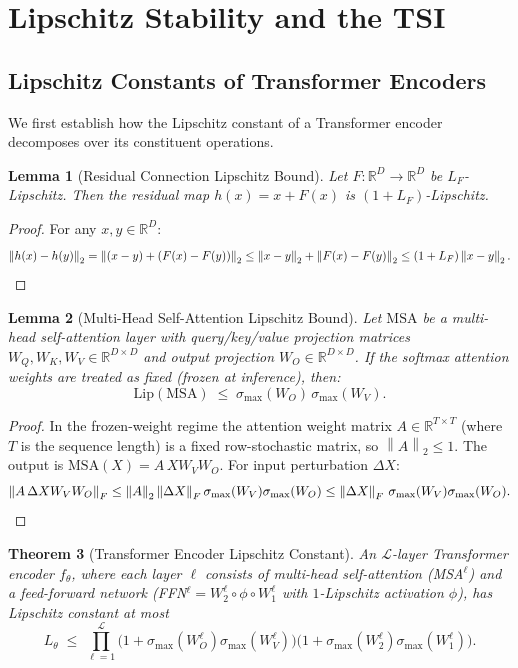 \documentclass[12pt]{article}
\newtheorem{theorem}{Theorem}[section]
\newtheorem{lemma}[theorem]{Lemma}
\theoremstyle{definition}
\theoremstyle{remark}
\newcommand{\R}{\mathbb{R}}
\newcommand{\norm}[1]{\left\lVert #1 \right\rVert}
\newcommand{\Lip}{\mathrm{Lip}}
\newcommand{\smax}{\sigma_{\max}}
\begin{document}
\section{Lipschitz Stability and the TSI}
\label{sec:stability_theory}

\subsection{Lipschitz Constants of Transformer Encoders}

We first establish how the Lipschitz constant of a Transformer encoder
decomposes over its constituent operations.

\begin{lemma}[Residual Connection Lipschitz Bound]
\label{lem:residual}
Let $F : \R^D \to \R^D$ be $L_F$-Lipschitz. Then the residual map
$h(x) = x + F(x)$ is $(1 + L_F)$-Lipschitz.
\end{lemma}

\begin{proof}
For any $x, y \in \R^D$:
\[
  \norm{h(x) - h(y)}_2 = \norm{(x-y) + (F(x)-F(y))}_2
  \leq \norm{x-y}_2 + \norm{F(x)-F(y)}_2
  \leq (1 + L_F)\norm{x-y}_2. \qedhere
\]
\end{proof}

\begin{lemma}[Multi-Head Self-Attention Lipschitz Bound]
\label{lem:attn}
Let $\mathrm{MSA}$ be a multi-head self-attention layer with query/key/value
projection matrices $W_Q, W_K, W_V \in \R^{D \times D}$ and output projection
$W_O \in \R^{D \times D}$. If the softmax attention weights are treated as
fixed (frozen at inference), then:
\[
  \Lip(\mathrm{MSA}) \;\leq\; \smax(W_O)\,\smax(W_V).
\]
\end{lemma}

\begin{proof}
In the frozen-weight regime the attention weight matrix $A \in \R^{T \times T}$
(where $T$ is the sequence length) is a fixed row-stochastic matrix, so
$\norm{A}_2 \leq 1$. The output is $\mathrm{MSA}(X) = A\,X W_V W_O$. For
input perturbation $\Delta X$:
\[
  \norm{A\,\Delta X W_V W_O}_F
  \leq \norm{A}_2 \norm{\Delta X}_F \smax(W_V)\smax(W_O)
  \leq \norm{\Delta X}_F\,\smax(W_V)\smax(W_O). \qedhere
\]
\end{proof}

\begin{theorem}[Transformer Encoder Lipschitz Constant]
\label{thm:transformer_lip}
An $\mathcal{L}$-layer Transformer encoder $f_\theta$, where each layer
$\ell$ consists of multi-head self-attention (MSA$^\ell$) and a feed-forward
network (FFN$^\ell = W_2^\ell \circ \phi \circ W_1^\ell$ with $1$-Lipschitz
activation $\phi$), has Lipschitz constant at most
\[
  L_\theta \;\leq\; \prod_{\ell=1}^{\mathcal{L}}
  \bigl(1 + \smax(W_{O}^\ell)\smax(W_V^\ell)\bigr)
  \bigl(1 + \smax(W_2^\ell)\smax(W_1^\ell)\bigr).
\]
\end{theorem}
\end{document}
